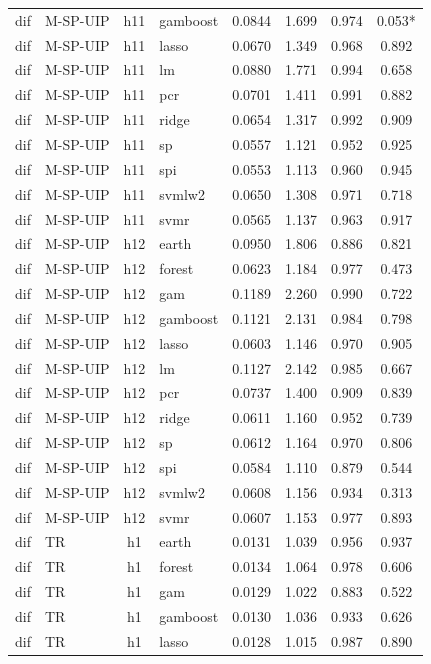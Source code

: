 \begin{ThreePartTable}
\begin{longtable}[t]{llclcccc}
dif & M-SP-UIP & h11 & gamboost & 0.0844 & 1.699 & 0.974 & 0.053*\\
dif & M-SP-UIP & h11 & lasso & 0.0670 & 1.349 & 0.968 & 0.892\\
dif & M-SP-UIP & h11 & lm & 0.0880 & 1.771 & 0.994 & 0.658\\
dif & M-SP-UIP & h11 & pcr & 0.0701 & 1.411 & 0.991 & 0.882\\
dif & M-SP-UIP & h11 & ridge & 0.0654 & 1.317 & 0.992 & 0.909\\
dif & M-SP-UIP & h11 & sp & 0.0557 & 1.121 & 0.952 & 0.925\\
dif & M-SP-UIP & h11 & spi & 0.0553 & 1.113 & 0.960 & 0.945\\
dif & M-SP-UIP & h11 & svmlw2 & 0.0650 & 1.308 & 0.971 & 0.718\\
dif & M-SP-UIP & h11 & svmr & 0.0565 & 1.137 & 0.963 & 0.917\\
\addlinespace
dif & M-SP-UIP & h12 & earth & 0.0950 & 1.806 & 0.886 & 0.821\\
dif & M-SP-UIP & h12 & forest & 0.0623 & 1.184 & 0.977 & 0.473\\
dif & M-SP-UIP & h12 & gam & 0.1189 & 2.260 & 0.990 & 0.722\\
dif & M-SP-UIP & h12 & gamboost & 0.1121 & 2.131 & 0.984 & 0.798\\
dif & M-SP-UIP & h12 & lasso & 0.0603 & 1.146 & 0.970 & 0.905\\
dif & M-SP-UIP & h12 & lm & 0.1127 & 2.142 & 0.985 & 0.667\\
dif & M-SP-UIP & h12 & pcr & 0.0737 & 1.400 & 0.909 & 0.839\\
dif & M-SP-UIP & h12 & ridge & 0.0611 & 1.160 & 0.952 & 0.739\\
dif & M-SP-UIP & h12 & sp & 0.0612 & 1.164 & 0.970 & 0.806\\
dif & M-SP-UIP & h12 & spi & 0.0584 & 1.110 & 0.879 & 0.544\\
dif & M-SP-UIP & h12 & svmlw2 & 0.0608 & 1.156 & 0.934 & 0.313\\
dif & M-SP-UIP & h12 & svmr & 0.0607 & 1.153 & 0.977 & 0.893\\
\addlinespace
dif & TR & h1 & earth & 0.0131 & 1.039 & 0.956 & 0.937\\
dif & TR & h1 & forest & 0.0134 & 1.064 & 0.978 & 0.606\\
dif & TR & h1 & gam & 0.0129 & 1.022 & 0.883 & 0.522\\
dif & TR & h1 & gamboost & 0.0130 & 1.036 & 0.933 & 0.626\\
dif & TR & h1 & lasso & 0.0128 & 1.015 & 0.987 & 0.890\\

\end{longtable}
\end{ThreePartTable}
